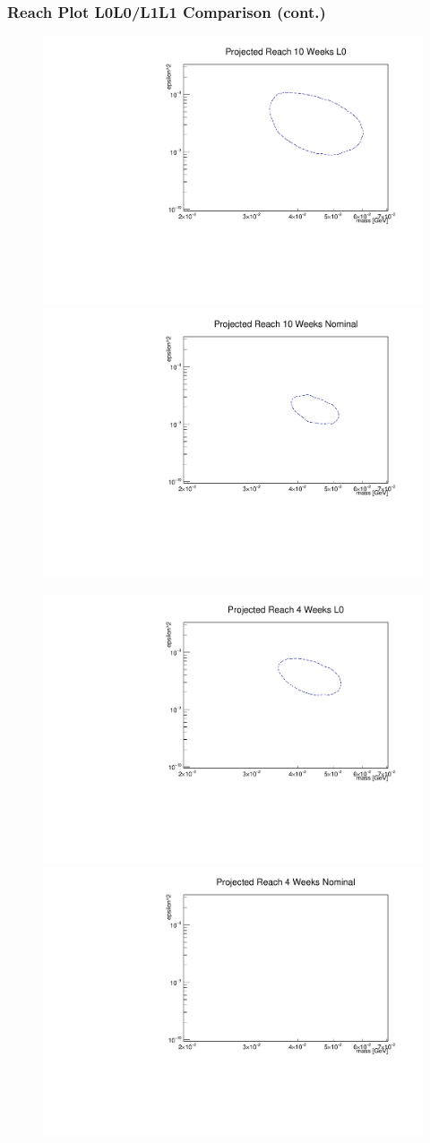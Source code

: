 \documentclass{beamer}
\begin{document}
\begin{frame}
\frametitle{Reach Plot L0L0/L1L1 Comparison (cont.)}
\begin{figure}
\includegraphics[width=0.4\linewidth]{figs/L0_10_weeks_loose.pdf}
\includegraphics[width=0.4\linewidth]{figs/nom_10_weeks_loose.pdf}
\end{figure}
\begin{figure}
\includegraphics[width=0.4\linewidth]{figs/L0_4_weeks_loose.pdf}
\includegraphics[width=0.4\linewidth]{figs/nom_4_weeks_loose.pdf}
\end{figure}

\end{frame}

\end{document}
